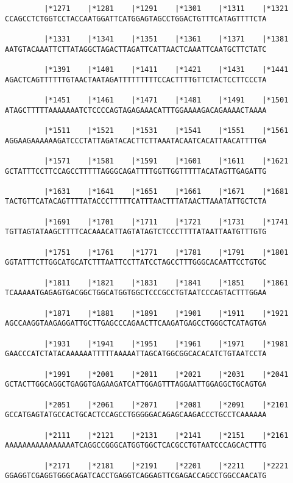 \documentclass{article}
\begin{document}
\begin{Verbatim}
         |*1271    |*1281    |*1291    |*1301    |*1311    |*1321
CCAGCCTCTGGTCCTACCAATGGATTCATGGAGTAGCCTGGACTGTTTCATAGTTTTCTA
  
         |*1331    |*1341    |*1351    |*1361    |*1371    |*1381
AATGTACAAATTCTTATAGGCTAGACTTAGATTCATTAACTCAAATTCAATGCTTCTATC
  
         |*1391    |*1401    |*1411    |*1421    |*1431    |*1441
AGACTCAGTTTTTTGTAACTAATAGATTTTTTTTTCCACTTTTGTTCTACTCCTTCCCTA
  
         |*1451    |*1461    |*1471    |*1481    |*1491    |*1501
ATAGCTTTTTAAAAAAATCTCCCCAGTAGAGAAACATTTGGAAAAGACAGAAAACTAAAA
  
         |*1511    |*1521    |*1531    |*1541    |*1551    |*1561
AGGAAGAAAAAAGATCCCTATTAGATACACTTCTTAAATACAATCACATTAACATTTTGA
  
         |*1571    |*1581    |*1591    |*1601    |*1611    |*1621
GCTATTTCCTTCCAGCCTTTTTAGGGCAGATTTTGGTTGGTTTTTACATAGTTGAGATTG
  
         |*1631    |*1641    |*1651    |*1661    |*1671    |*1681
TACTGTTCATACAGTTTTATACCCTTTTTCATTTAACTTTATAACTTAAATATTGCTCTA
  
         |*1691    |*1701    |*1711    |*1721    |*1731    |*1741
TGTTAGTATAAGCTTTTCACAAACATTAGTATAGTCTCCCTTTTATAATTAATGTTTGTG
  
         |*1751    |*1761    |*1771    |*1781    |*1791    |*1801
GGTATTTCTTGGCATGCATCTTTAATTCCTTATCCTAGCCTTTGGGCACAATTCCTGTGC
  
         |*1811    |*1821    |*1831    |*1841    |*1851    |*1861
TCAAAAATGAGAGTGACGGCTGGCATGGTGGCTCCCGCCTGTAATCCCAGTACTTTGGAA
  
         |*1871    |*1881    |*1891    |*1901    |*1911    |*1921
AGCCAAGGTAAGAGGATTGCTTGAGCCCAGAACTTCAAGATGAGCCTGGGCTCATAGTGA
  
         |*1931    |*1941    |*1951    |*1961    |*1971    |*1981
GAACCCATCTATACAAAAAATTTTTAAAAATTAGCATGGCGGCACACATCTGTAATCCTA
  
         |*1991    |*2001    |*2011    |*2021    |*2031    |*2041
GCTACTTGGCAGGCTGAGGTGAGAAGATCATTGGAGTTTAGGAATTGGAGGCTGCAGTGA
  
         |*2051    |*2061    |*2071    |*2081    |*2091    |*2101
GCCATGAGTATGCCACTGCACTCCAGCCTGGGGGACAGAGCAAGACCCTGCCTCAAAAAA
  
         |*2111    |*2121    |*2131    |*2141    |*2151    |*2161
AAAAAAAAAAAAAAAATCAGGCCGGGCATGGTGGCTCACGCCTGTAATCCCAGCACTTTG
  
         |*2171    |*2181    |*2191    |*2201    |*2211    |*2221
GGAGGTCGAGGTGGGCAGATCACCTGAGGTCAGGAGTTCGAGACCAGCCTGGCCAACATG
  

\end{Verbatim}
\end{document}
